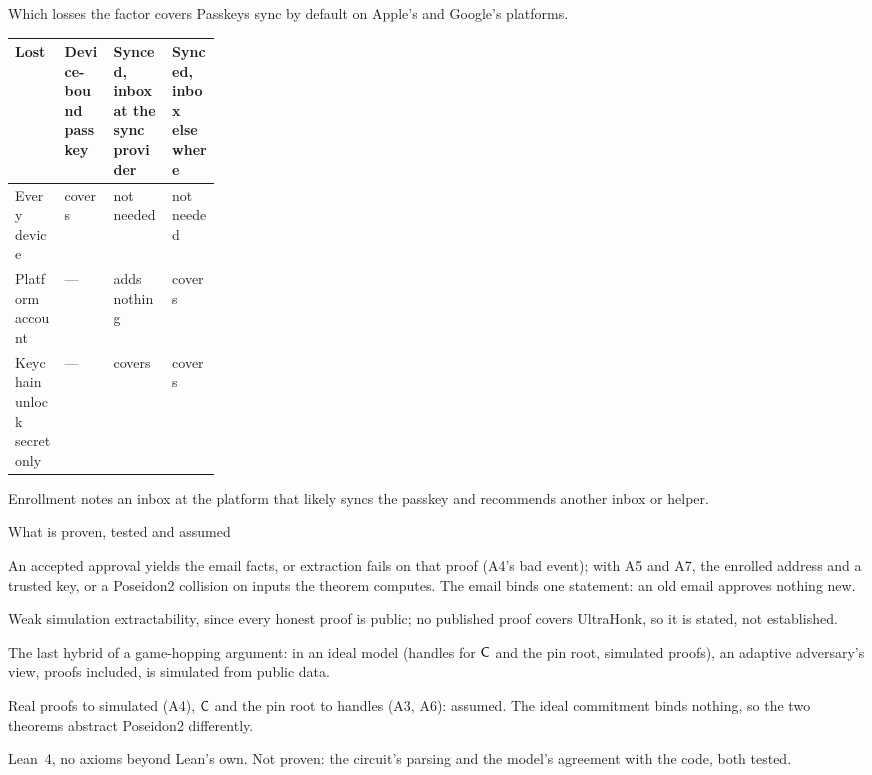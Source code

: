 \documentclass[aspectratio=169,11pt]{beamer}
\begin{document}
\begin{frame}{Which losses the factor covers}
  \small
  Passkeys sync by default on Apple's and Google's
  platforms.\par\medskip
  \begin{tabularx}{\linewidth}{@{}>{\raggedright\arraybackslash}p{0.24\linewidth}>{\raggedright\arraybackslash}X>{\raggedright\arraybackslash}X>{\raggedright\arraybackslash}X@{}}
    \toprule
    Lost & Device-bound passkey & Synced, inbox at the sync provider & Synced, inbox elsewhere \\
    \midrule
    Every device & covers & not needed & not needed \\
    Platform account & --- & adds nothing & covers \\
    Keychain unlock secret only & --- & covers & covers \\
    \bottomrule
  \end{tabularx}
  \par\medskip
  Enrollment notes an inbox at the platform that likely syncs the passkey
  and recommends another inbox or helper.
\end{frame}

\begin{frame}{What is proven, tested and assumed}
  \small
  \begin{description}[Soundness]\footnotesize
    \item[Soundness] An accepted approval yields the email facts, or
      extraction fails on that proof (A4's bad event); with A5 and A7, the
      enrolled address and a trusted key, or a Poseidon2 collision on inputs
      the theorem computes. The email binds one statement: an old email
      approves nothing new.
    \item[A4] Weak simulation extractability, since every honest proof is
      public; no published proof covers UltraHonk, so it is stated, not
      established.
    \item[Privacy] The last hybrid of a game-hopping argument: in an ideal
      model (handles for $\mathsf{C}$ and the pin root, simulated proofs), an
      adaptive adversary's view, proofs included, is simulated from public
      data.
    \item[Hybrids] Real proofs to simulated (A4), $\mathsf{C}$ and the pin root to
      handles (A3, A6): assumed. The ideal commitment binds nothing, so the
      two theorems abstract Poseidon2
      differently.
  \end{description}
  \medskip
  Lean~4, no axioms beyond Lean's own. Not proven: the
  circuit's parsing and the model's agreement with the code, both
  tested.
\end{frame}
\end{document}
